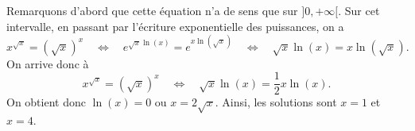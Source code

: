 Remarquons d'abord que cette équation n'a de sens que sur $]0,+\infty[$. Sur cet intervalle, en passant par l'écriture exponentielle des puissances, on a 
\[x^{\sqrt{x}} =(\sqrt{x})^x \quad \Leftrightarrow \quad e^{\sqrt{x} \ln(x)} = e^{x \ln(\sqrt{x})}
\quad \Leftrightarrow \quad \sqrt{x} \ln(x) = x \ln(\sqrt{x}).\]
On arrive donc à
\[x^{\sqrt{x}} =(\sqrt{x})^x \quad \Leftrightarrow \quad \sqrt{x} \ln(x) = \frac{1}{2} x \ln(x).\]
On obtient donc $\ln(x) =0$ ou $x = 2 \sqrt{x}$. Ainsi, les solutions sont $x =1$ et $x=4$.